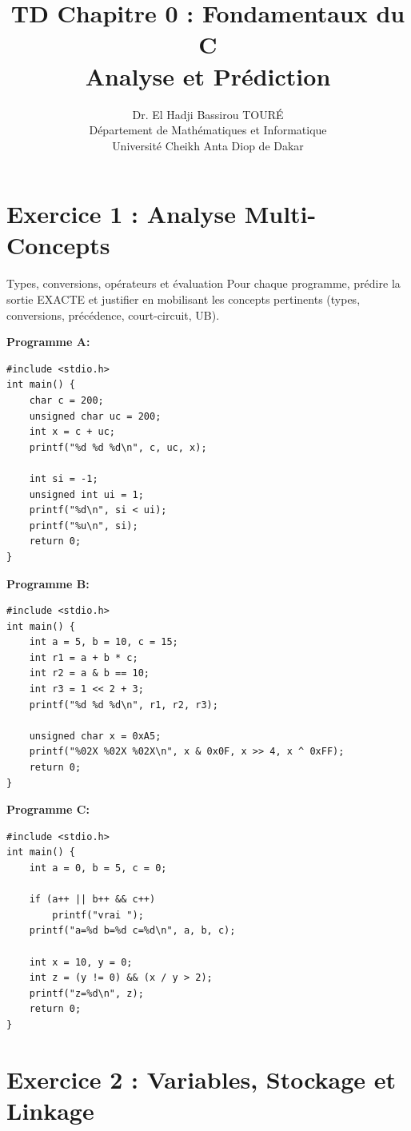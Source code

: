 \documentclass[10pt,a4paper]{article}
\title{\textbf{TD Chapitre 0 : Fondamentaux du C}\\
\large Analyse et Prédiction}
\author{Dr. El Hadji Bassirou TOURÉ\\
Département de Mathématiques et Informatique\\
Université Cheikh Anta Diop de Dakar}
\date{}
\begin{document}
\maketitle

\section*{Exercice 1 : Analyse Multi-Concepts}

\begin{exercicebox}{Types, conversions, opérateurs et évaluation}
Pour chaque programme, prédire la sortie EXACTE et justifier en mobilisant les concepts pertinents (types, conversions, précédence, court-circuit, UB).

\textbf{Programme A:}
\begin{lstlisting}
#include <stdio.h>
int main() {
    char c = 200;
    unsigned char uc = 200;
    int x = c + uc;
    printf("%d %d %d\n", c, uc, x);
    
    int si = -1;
    unsigned int ui = 1;
    printf("%d\n", si < ui);
    printf("%u\n", si);
    return 0;
}
\end{lstlisting}

\textbf{Programme B:}
\begin{lstlisting}
#include <stdio.h>
int main() {
    int a = 5, b = 10, c = 15;
    int r1 = a + b * c;
    int r2 = a & b == 10;
    int r3 = 1 << 2 + 3;
    printf("%d %d %d\n", r1, r2, r3);
    
    unsigned char x = 0xA5;
    printf("%02X %02X %02X\n", x & 0x0F, x >> 4, x ^ 0xFF);
    return 0;
}
\end{lstlisting}

\textbf{Programme C:}
\begin{lstlisting}
#include <stdio.h>
int main() {
    int a = 0, b = 5, c = 0;
    
    if (a++ || b++ && c++) 
        printf("vrai ");
    printf("a=%d b=%d c=%d\n", a, b, c);
    
    int x = 10, y = 0;
    int z = (y != 0) && (x / y > 2);
    printf("z=%d\n", z);
    return 0;
}
\end{lstlisting}
\end{exercicebox}

\section*{Exercice 2 : Variables, Stockage et Linkage}
\end{document}
